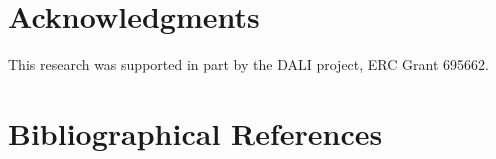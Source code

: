 \documentclass[10pt, a4paper]{article}
\begin{document}
\section{Acknowledgments}

This research was supported in part by the DALI project, ERC Grant 695662.

\newpage


\section{Bibliographical References}
\label{main:ref}



\end{document}

